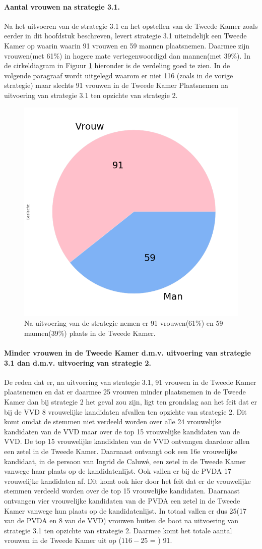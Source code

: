 \paragraph{Aantal vrouwen na strategie 3.1.}
Na het uitvoeren van de strategie 3.1 en het opstellen van de Tweede Kamer zoals eerder in dit hoofdstuk beschreven, levert strategie 3.1 uiteindelijk een Tweede Kamer op waarin waarin 91 vrouwen en 59 mannen plaatsnemen. Daarmee zijn vrouwen(met 61\%) in hogere mate vertegenwoordigd dan mannen(met 39\%). In de cirkeldiagram in Figuur \ref{fig:pcS31V} hieronder is de verdeling goed te zien. In de volgende paragraaf wordt uitgelegd waarom er niet 116 (zoals in de vorige strategie) maar slechts 91 vrouwen in de Tweede Kamer Plaatsnemen na uitvoering van strategie 3.1 ten opzichte van strategie 2.

\begin{figure}[H]
\centering
	\includegraphics[width=0.35\linewidth]{pie_chart_top15_of_topN.png}

			\caption{Na uitvoering van de strategie nemen er 91 vrouwen(61\%) en 59 mannen(39\%) plaats in de Tweede Kamer.}

\label{fig:pcS31V}
\end{figure}

\paragraph{Minder vrouwen in de Tweede Kamer d.m.v. uitvoering van strategie 3.1 dan d.m.v. uitvoering van strategie 2.}
De reden dat er, na uitvoering van strategie 3.1, 91 vrouwen in de Tweede Kamer plaatsnemen en dat er daarmee 25 vrouwen minder plaatsnemen in de Tweede Kamer dan bij strategie 2 het geval zou zijn, ligt ten grondslag aan het feit dat er bij de VVD 8 vrouwelijke kandidaten afvallen ten opzichte van strategie 2. Dit komt omdat de stemmen niet verdeeld worden over alle 24 vrouwelijke kandidaten van de VVD maar over de top 15 vrouwelijke kandidaten van de VVD. De top 15 vrouwelijke kandidaten van de VVD ontvangen daardoor allen een zetel in de Tweede Kamer. Daarnaast ontvangt ook een 16e vrouwelijke kandidaat, in de persoon van Ingrid de Caluwé, een zetel in de Tweede Kamer vanwege haar plaats op de kandidatenlijst. Ook vallen er bij de PVDA 17 vrouwelijke kandidaten af. Dit komt ook hier door het feit dat er de vrouwelijke stemmen verdeeld worden over de top 15 vrouwelijke kandidaten. Daarnaast ontvangen vier vrouwelijke kandidaten van de PVDA een zetel in de Tweede Kamer vanwege hun plaats op de kandidatenlijst. In totaal vallen er dus 25(17 van de PVDA en 8 van de VVD) vrouwen buiten de boot na uitvoering van strategie 3.1 ten opzichte van strategie 2. Daarmee komt het totale aantal vrouwen in de Tweede Kamer uit op ($116-25$ = ) 91. 



